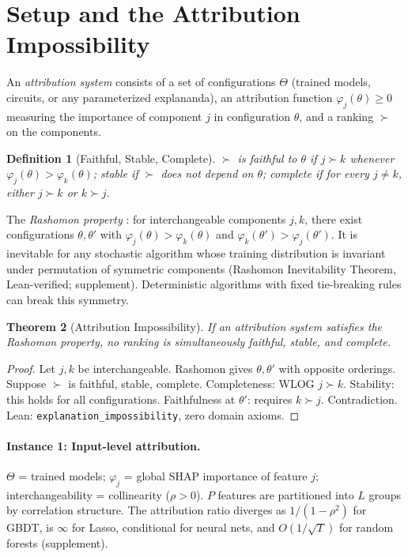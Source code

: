 \documentclass{article}
\newtheorem{theorem}{Theorem}
\newtheorem{definition}[theorem]{Definition}
\newcommand{\GBDT}{\textsc{GBDT}}
\begin{document}
\section{Setup and the Attribution Impossibility}
\label{sec:setup}

An \emph{attribution system} consists of a set of configurations $\Theta$ (trained models, circuits, or any parameterized explananda), an attribution function $\varphi_j(\theta) \geq 0$ measuring the importance of component $j$ in configuration $\theta$, and a ranking $\succ$ on the components.

\begin{definition}[Faithful, Stable, Complete]
\label{def:desiderata}
$\succ$ is \emph{faithful} to $\theta$ if $j \succ k$ whenever $\varphi_j(\theta) > \varphi_k(\theta)$;
\emph{stable} if $\succ$ does not depend on $\theta$;
\emph{complete} if for every $j \neq k$, either $j \succ k$ or $k \succ j$.
\end{definition}

The \emph{Rashomon property} \citep{rudin2024amazing}: for interchangeable components $j, k$, there exist configurations $\theta, \theta'$ with $\varphi_j(\theta) > \varphi_k(\theta)$ and $\varphi_k(\theta') > \varphi_j(\theta')$. It is inevitable for any stochastic algorithm whose training distribution is invariant under permutation of symmetric components (Rashomon Inevitability Theorem, Lean-verified; supplement). Deterministic algorithms with fixed tie-breaking rules can break this symmetry.

\begin{theorem}[Attribution Impossibility]
\label{thm:impossibility}
If an attribution system satisfies the Rashomon property, no ranking is simultaneously faithful, stable, and complete.
\end{theorem}

\begin{proof}
Let $j, k$ be interchangeable. Rashomon gives $\theta, \theta'$ with opposite orderings. Suppose $\succ$ is faithful, stable, complete. Completeness: WLOG $j \succ k$. Stability: this holds for all configurations. Faithfulness at $\theta'$: requires $k \succ j$. Contradiction. \hfill Lean: \texttt{explanation\_impossibility}, zero domain axioms.
\end{proof}

\paragraph{Instance 1: Input-level attribution.}
$\Theta$ = trained models; $\varphi_j$ = global SHAP importance of feature $j$; interchangeability = collinearity ($\rho > 0$).
$P$ features are partitioned into $L$ groups by correlation structure.
The attribution ratio diverges as $1/(1{-}\rho^2)$ for \GBDT{}, is $\infty$ for Lasso, conditional for neural nets, and $O(1/\sqrt{T})$ for random forests (supplement).
\end{document}
